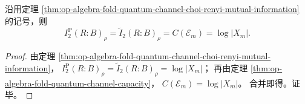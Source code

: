 \begin{corollary}\label{cor:op-algebra-fold-quantum-channel-i2-equals-classical-capacity}
沿用定理 \ref{thm:op-algebra-fold-quantum-channel-choi-renyi-mutual-information} 的记号，则
\[
I_2^{\mathrm P}(R\!:\!B)_\rho
=
\widetilde I_2(R\!:\!B)_\rho
=
C(\mathcal{E}_m)
=
\log|X_m|.
\]
\end{corollary}
\begin{proof}
由定理 \ref{thm:op-algebra-fold-quantum-channel-choi-renyi-mutual-information}，
\(
I_2^{\mathrm P}(R\!:\!B)_\rho
=
\widetilde I_2(R\!:\!B)_\rho
=
\log|X_m|
\)；
再由定理 \ref{thm:op-algebra-fold-quantum-channel-capacity}，
\(
C(\mathcal{E}_m)=\log|X_m|
\)。
合并即得。证毕。
\end{proof}

